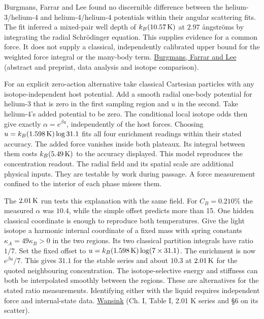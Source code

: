 \documentclass[11pt,a4paper]{article}
\begin{document}
Burgmans, Farrar and Lee found no discernible difference between the
helium-3/helium-4 and helium-4/helium-4 potentials within their angular
scattering fits. The fit inferred a mixed-pair well depth of
\(k_B(10.57\,{\rm K})\) at \(2.97\) ångströms by integrating the radial
Schrödinger equation. This supplies evidence for a common force. It does
not supply a classical, independently calibrated upper bound for the
weighted force integral or the many-body term.
\href{https://doi.org/10.1063/1.432401}{Burgmans, Farrar and Lee}
(abstract and preprint, data analysis and isotope comparison).

For an explicit zero-action alternative take classical Cartesian
particles with any isotope-independent host potential. Add a smooth
radial one-body potential for helium-3 that is zero in the first
sampling region and \(u\) in the second. Take helium-4's added potential
to be zero. The conditional local isotope odds then give exactly
\(\alpha=e^{\beta u}\), independently of the host forces. Choosing
\(u=k_B(1.598\,{\rm K})\log 31.1\) fits all four enrichment readings
within their stated accuracy. The added force vanishes inside both
plateaux. Its integral between them costs \(k_B(5.49\,{\rm K})\) to the
accuracy displayed. This model reproduces the concentration readout. The
radial field and its spatial scale are additional physical inputs. They
are testable by work during passage. A force measurement confined to the
interior of each phase misses them.

The \(2.01\,{\rm K}\) run tests this explanation with the same field.
For \(C_B=0.210\%\) the measured \(\alpha\) was \(10.4\), while the
simple offset predicts more than 15. One hidden classical coordinate is
enough to reproduce both temperatures. Give the light isotope a harmonic
internal coordinate of a fixed mass with spring constants
\(\kappa_A=49\kappa_B>0\) in the two regions. Its two classical
partition integrals have ratio \(1/7\). Set the fixed offset to
\(u=k_B(1.598\,{\rm K})\log(7\times31.1)\). The enrichment is now
\(e^{\beta u}/7\). This gives \(31.1\) for the stable series and about
\(10.3\) at \(2.01\,{\rm K}\) for the quoted neighbouring concentration.
The isotope-selective energy and stiffness can both be interpolated
smoothly between the regions. These are alternatives for the stated
ratio measurements. Identifying either with the liquid requires
independent force and internal-state data.
\href{https://www.lorentz.leidenuniv.nl/history/proefschriften/sources/Wansink_1957.pdf}{Wansink}
(Ch. I, Table I, 2.01 K series and §6 on its scatter).
\end{document}
